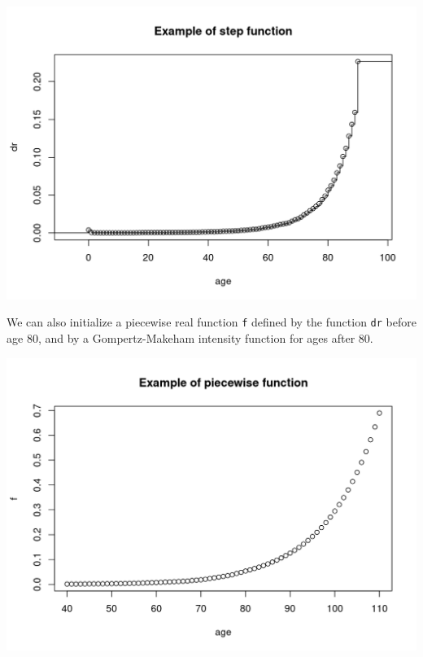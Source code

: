 \begin{center}\includegraphics{plot_stepfun-1} \end{center}

We can also initialize a piecewise real function \texttt{f} defined by the function \texttt{dr} before age 80, and by a Gompertz-Makeham intensity function for ages after 80.

\begin{Shaded}
\begin{Highlighting}[]
\OtherTok{\textless{}{-}} \NormalTok{(}\NormalTok{, }\NormalTok{(}\NormalTok{, }\NormalTok{)))}
\OtherTok{\textless{}{-}} \NormalTok{(}\NormalTok{, }\NormalTok{)}
\NormalTok{, }\NormalTok{, }\NormalTok{)}
\end{Highlighting}
\end{Shaded}

\begin{center}\includegraphics{plot_piecewise-1} \end{center}

